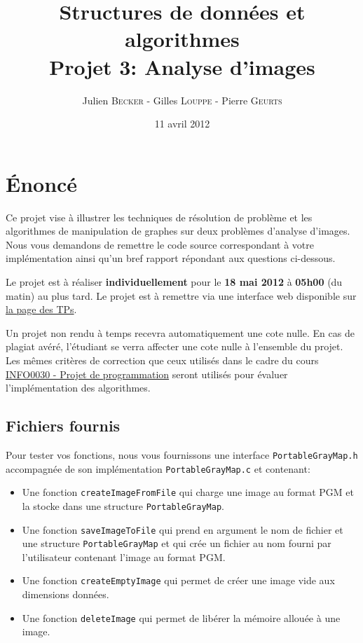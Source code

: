 \documentclass[a4paper,10pt]{article}
\title{
    \textbf{Structures de données et algorithmes}\\
    Projet 3: Analyse d'images
}
\author{Julien \textsc{Becker} - Gilles \textsc{Louppe} - Pierre \textsc{Geurts}}
\date{11 avril 2012}
\begin{document}
\maketitle

\section*{\'Enoncé}

Ce projet vise à illustrer les techniques de résolution de problème et
les algorithmes de manipulation de graphes sur deux problèmes
d'analyse d'images. Nous vous demandons de remettre le code source
correspondant à votre implémentation ainsi qu'un bref rapport
répondant aux questions ci-dessous.

Le projet est à réaliser {\bf individuellement} pour le {\bf 18 mai
  2012} à {\bf 05h00} (du matin) au plus tard. Le projet est à
remettre via une interface web disponible sur
\href{http://www.montefiore.ulg.ac.be/~glouppe/2011-2012/students.info0902.php}{la
  page des TPs}.

Un projet non rendu à temps recevra automatiquement une cote nulle. En
cas de plagiat avéré, l'étudiant se verra affecter une cote nulle à
l'ensemble du projet. Les mêmes critères de correction que ceux
utilisés dans le cadre du cours
\href{http://www.montefiore.ulg.ac.be/~info0030/}{INFO0030 - Projet de
  programmation} seront utilisés pour évaluer l'implémentation des
algorithmes.

\subsection*{Fichiers fournis}

Pour tester vos fonctions, nous vous fournissons une interface \texttt{PortableGrayMap.h} accompagnée de son implémentation \texttt{PortableGrayMap.c} et contenant:
\begin{itemize}
\item Une fonction \texttt{createImageFromFile} qui charge une image au format PGM et la stocke dans une structure \texttt{PortableGrayMap}.
\item Une fonction \texttt{saveImageToFile} qui prend en argument le nom de fichier et une structure \texttt{PortableGrayMap} et qui crée un fichier au nom fourni par l'utilisateur contenant l'image au format PGM.
\item Une fonction \texttt{createEmptyImage} qui permet de créer une image vide aux dimensions données.
\item Une fonction \texttt{deleteImage} qui permet de libérer la mémoire allouée à une image.
\end{itemize}
\end{document}
